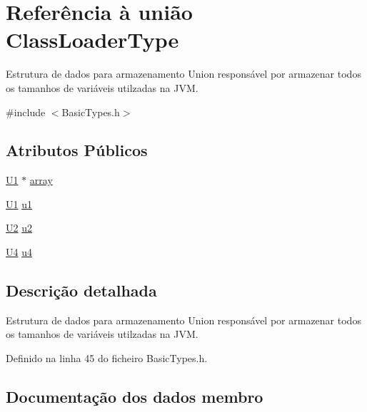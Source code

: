 \hypertarget{unionClassLoaderType}{}\section{Referência à união Class\+Loader\+Type}
\label{unionClassLoaderType}


Estrutura de dados para armazenamento Union responsável por armazenar todos os tamanhos de variáveis utilzadas na J\+VM.  




{\ttfamily \#include $<$Basic\+Types.\+h$>$}

\subsection*{Atributos Públicos}
\begin{DoxyCompactItemize}
\item 
\hyperlink{BasicTypes_8h_a9bffe5bb2564f91cd90fb7d06848f9a8}{U1} $\ast$ \hyperlink{unionClassLoaderType_a35ae4ff3dac1fe01b69c3649e200790c}{array}
\item 
\hyperlink{BasicTypes_8h_a9bffe5bb2564f91cd90fb7d06848f9a8}{U1} \hyperlink{unionClassLoaderType_ac3612ba54bfba5c4b856dcba8db1a8a8}{u1}
\item 
\hyperlink{BasicTypes_8h_a90240657108b1b457eef9d3f76e0202e}{U2} \hyperlink{unionClassLoaderType_aaf24600dbc4afe99210fa000bdb1e6d7}{u2}
\item 
\hyperlink{BasicTypes_8h_ac6d2ba2e53dd424684ead2f40e74a8b6}{U4} \hyperlink{unionClassLoaderType_aad01cfe6aac48729f55425b67a70622e}{u4}
\end{DoxyCompactItemize}


\subsection{Descrição detalhada}
Estrutura de dados para armazenamento Union responsável por armazenar todos os tamanhos de variáveis utilzadas na J\+VM. 

Definido na linha 45 do ficheiro Basic\+Types.\+h.



\subsection{Documentação dos dados membro}
\mbox{\label{unionClassLoaderType_a35ae4ff3dac1fe01b69c3649e200790c}} 
